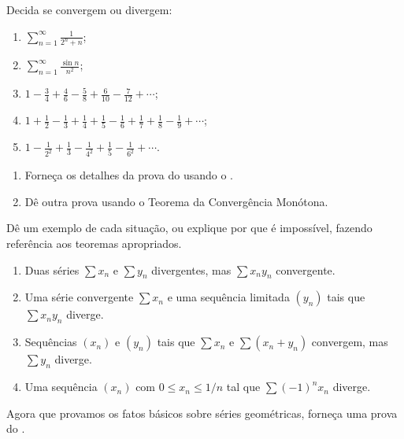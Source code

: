 \begin{exercise}\label{ex:2-7-2}
Decida se convergem ou divergem:
\begin{enumerate}[label=\alph*)]
\item $\displaystyle\sum_{n=1}^{\infty}\frac1{2^n+n}$;
\item $\displaystyle\sum_{n=1}^{\infty}\frac{\sin n}{n^2}$;
\item $\displaystyle1-\frac34+\frac46-\frac58+\frac6{10}-\frac7{12}+\cdots$;
\item $\displaystyle1+\frac12-\frac13+\frac14+\frac15-\frac16+\frac17+\frac18-\frac19+\cdots$;
\item $\displaystyle1-\frac1{2^2}+\frac13-\frac1{4^2}+\frac15-\frac1{6^2}+\cdots$.
\end{enumerate}
\end{exercise}


\bigskip 
\begin{exercise}\label{ex:2-7-3}
\begin{enumerate}[label=\alph*)]
\item Forneça os detalhes da prova do  usando o .
\item Dê outra prova usando o Teorema da Convergência Monótona.
\end{enumerate}
\end{exercise}

\begin{exercise}\label{ex:2-7-4}
Dê um exemplo de cada situação, ou explique por que é impossível, fazendo referência aos teoremas apropriados.
\begin{enumerate}[label=\alph*)]
\item Duas séries $\sum x_n$ e $\sum y_n$ divergentes, mas $\sum x_ny_n$ convergente.
\item Uma série convergente $\sum x_n$ e uma sequência limitada $(y_n)$ tais que $\sum x_ny_n$ diverge.
\item Sequências $(x_n)$ e $(y_n)$ tais que $\sum x_n$ e $\sum(x_n+y_n)$ convergem, mas $\sum y_n$ diverge.
\item Uma sequência $(x_n)$ com $0\leq x_n\leq1/n$ tal que $\sum(-1)^nx_n$ diverge.
\end{enumerate}
\end{exercise}

\begin{exercise}\label{ex:2-7-5}
Agora que provamos os fatos básicos sobre séries geométricas, forneça uma prova do .
\end{exercise}


